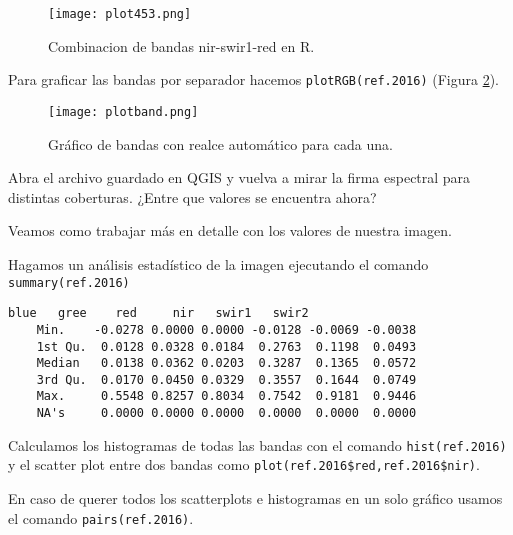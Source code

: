 \begin{exa}
    \begin{figure}[h!]
    \begin{center}
        \texttt{[image: plot453.png]}
    \end{center}
    \caption{Combinacion de bandas nir-swir1-red en R.}
    \label{fig:plot453}
    \end{figure}

    Para graficar las bandas por separador hacemos \texttt{plotRGB(ref.2016)}
    (Figura \ref{fig:plotband}).

    \begin{figure}[h!]
    \begin{center}
        \texttt{[image: plotband.png]}
    \end{center}
    \caption{Gr\'afico de bandas con realce autom\'atico para cada una.}
    \label{fig:plotband}
    \end{figure}

\end{exa}

\begin{act}
   Abra el archivo guardado en QGIS y vuelva a mirar la firma espectral para
   distintas coberturas. ¿Entre que valores se encuentra ahora?
\end{act}

Veamos como trabajar m\'as en detalle con los valores de nuestra imagen.

\begin{exa}

    Hagamos un an\'alisis estad\'istico de la imagen ejecutando el
    comando \texttt{summary(ref.2016)}
    \begin{Verbatim}[fontsize=\small]
               blue   gree    red     nir   swir1   swir2
    Min.    -0.0278 0.0000 0.0000 -0.0128 -0.0069 -0.0038
    1st Qu.  0.0128 0.0328 0.0184  0.2763  0.1198  0.0493
    Median   0.0138 0.0362 0.0203  0.3287  0.1365  0.0572
    3rd Qu.  0.0170 0.0450 0.0329  0.3557  0.1644  0.0749
    Max.     0.5548 0.8257 0.8034  0.7542  0.9181  0.9446
    NA's     0.0000 0.0000 0.0000  0.0000  0.0000  0.0000
    \end{Verbatim}
    Calculamos los histogramas de todas las bandas con el
    comando \texttt{hist(ref.2016)} y el scatter plot entre dos bandas como
  \verb|plot(ref.2016$red,ref.2016$nir)|.

    En caso de querer todos los scatterplots e histogramas en un solo gr\'afico
    usamos el comando \texttt{pairs(ref.2016)}.
    \end{exa}


